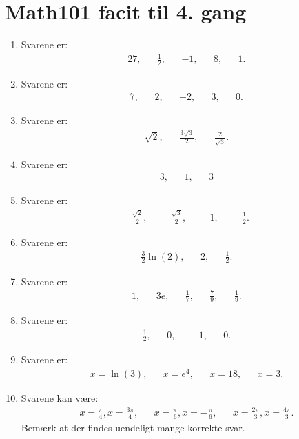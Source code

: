 \newpage
\section{Math101 facit til 4. gang}
\begin{enumerate}
	\item Svarene er:
	\begin{align*}
	27,&& \frac{1}{2}, &&-1,&&8,&&1.
	\end{align*}
	\item Svarene er:
	\begin{align*}
	7,&& 2,&& -2,&& 3,&&0.
	\end{align*}
	
	\item Svarene er:
	\begin{align*}
	\sqrt{2},&& \frac{3\sqrt{3}}{2},&& \frac{2}{\sqrt{3}}.
	\end{align*}
	

	\item Svarene er:
	\begin{align*}
	3,&&1,&& 3
	\end{align*}
	
	\item Svarene er:
	\begin{align*}
	-\frac{\sqrt{2}}{2},&& -\frac{\sqrt{3}}{2},&&-1,&& -\frac{1}{2}.
	\end{align*}
	
	
	\item Svarene er:
	\begin{align*}
	\frac{3}{2}\ln(2),&& 2,&& \frac{1}{2}.
	\end{align*}
	
	
	\item Svarene er:
	\begin{align*}
	1,&&3e,&& \frac{1}{7},&& \frac{7}{9},&& \frac{1}{9}.
	\end{align*}
	
	\item Svarene er:
	\begin{align*}
	\frac{1}{2},&& 0,&& -1,&& 0.
	\end{align*}
	
	
	\item Svarene er:
	\begin{align*}
	x=\ln(3),&& x=e^4,&& x=18,&& x=3.
	\end{align*}
	

	\item Svarene kan være:
	\begin{align*}
	x=\frac{\pi}{4},x=\frac{3\pi}{4},&& x=\frac{\pi}{6},x=-\frac{\pi}{6},&& x=\frac{2\pi}{3},x=\frac{4\pi}{3}.
	\end{align*}
	Bemærk at der findes uendeligt mange korrekte svar.


\end{enumerate}

